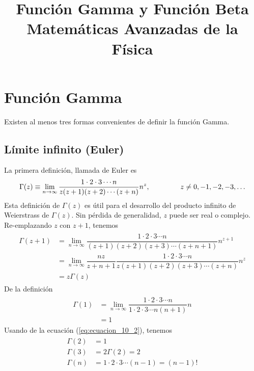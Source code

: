 
\usepackage{mathrsfs}
\usepackage{bigints}
\title{Función Gamma y Función Beta \\ {\large Matemáticas Avanzadas de la Física}}
\date{ }

\renewcommand\labelenumii{\theenumi.{\arabic{enumii}}}
\maketitle
\fontsize{14}{14}\selectfont
\section{Función Gamma}
Existen al menos tres formas convenientes de definir la función Gamma.
\subsection{Límite infinito (Euler)}
La primera definición, llamada de Euler es
\begin{equation}
\Gamma(z) \equiv \lim_{n \to \infty} \dfrac{1 \cdot 2 \cdot 3 \cdots n}{z (z+1) (z+2) \cdots (z+n)} n^{z}, \hspace{1.5cm} z \neq	0, -1,-2,-3, \ldots
\label{eq:ecuacion_10_1}
\end{equation}
Esta definición de $\Gamma(z)$ es útil para el desarrollo del producto infinito de Weierstrass de $\Gamma (z)$. Sin pérdida de generalidad, $z$ puede ser real o complejo. Re-emplazando $z$ con $z+1$, tenemos
\begin{eqnarray}
\begin{aligned}
\Gamma (z+1) &= \lim_{n \to \infty} \dfrac{1 \cdot 2 \cdot 3 \cdots n}{(z+1) (z+2)(z+3) \cdots (z+n+1)} n^{z+1} \\
&= \lim_{n \to \infty} \dfrac{nz}{z+n+1} \dfrac{1 \cdot 2 \cdot 3 \cdots n}{z (z+1) (z+2)(z+3) \cdots (z+n)} n^{z} \\
&= z \Gamma (z)
\label{eq:ecuacion_10_2}
\end{aligned}
\end{eqnarray}
De la definición
\begin{eqnarray}
\begin{aligned}
\Gamma (1) &= \lim_{n \to \infty} \dfrac{1 \cdot 2 \cdot 3 \cdots n}{1 \cdot 2 \cdot 3 \cdots n(n+1)} n \\
&= 1
\label{eq:ecuacion_10_3}
\end{aligned}
\end{eqnarray}
Usando de la ecuación (\ref{eq:ecuacion_10_2}), tenemos
\begin{eqnarray}
\begin{aligned}
\Gamma (2) &= 1 \\
\Gamma (3) &=  2 \Gamma(2) =  2 \\
\Gamma (n) &= 1 \cdot 2 \cdot 3 \cdots (n-1) =  (n-1)!
\label{eq:ecuacion_10_4}
\end{aligned}
\end{eqnarray}
